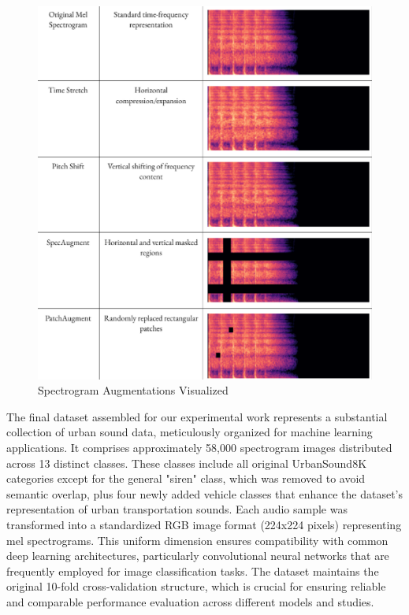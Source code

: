 \documentclass[11pt]{article}
\begin{document}
\begin{figure}
    \centering
    \includegraphics[width=1\linewidth]{latex//assets/augmentations.PNG}
    \caption{Spectrogram Augmentations Visualized}
    
\end{figure}
The final dataset assembled for our experimental work represents a substantial collection of urban sound data, meticulously organized for machine learning applications. It comprises approximately 58,000 spectrogram images distributed across 13 distinct classes. These classes include all original UrbanSound8K categories except for the general "siren" class, which was removed to avoid semantic overlap, plus four newly added vehicle classes that enhance the dataset's representation of urban transportation sounds.
Each audio sample was transformed into a standardized RGB image format (224x224 pixels) representing mel spectrograms. This uniform dimension ensures compatibility with common deep learning architectures, particularly convolutional neural networks that are frequently employed for image classification tasks. The dataset maintains the original 10-fold cross-validation structure, which is crucial for ensuring reliable and comparable performance evaluation across different models and studies.
\end{document}
